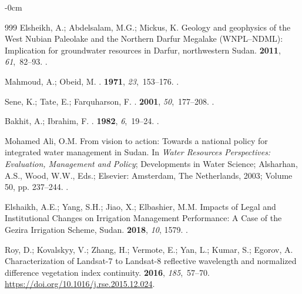 \documentclass[jimaging,article,accept,pdftex,moreauthors]{Definitions/mdpi}
\begin{document}
\begin{adjustwidth}{-\extralength}{0cm}
\begin{thebibliography}{999}
Elsheikh, A.; Abdelsalam, M.G.; Mickus, K.
\newblock Geology and geophysics of the West Nubian Paleolake and the Northern
  Darfur Megalake (WNPL–NDML): Implication for groundwater resources in
  Darfur, northwestern Sudan.
 {\bf 2011}, {\em 61},~82--93.
.

Mahmoud, A.; Obeid, M.
.
 {\bf 1971}, {\em 23},~153--176.
.

Sene, K.; Tate, E.; Farquharson, F.
.
 {\bf 2001}, {\em 50},~177--208.
.

Bakhit, A.; Ibrahim, F.
.
 {\bf 1982}, {\em 6},~19--24.
.

{Mohamed Ali}, O.M.
\newblock From vision to action: Towards a national policy for integrated water
  management in Sudan. In {\em Water Resources Perspectives: Evaluation,
  Management and Policy}; Developments in Water Science; Alsharhan, A.S., Wood, W.W., Eds.; Elsevier: Amsterdam, The Netherlands, %
  2003;
  Volume 50, pp. 237--244.
.

Elshaikh, A.E.; Yang, S.H.; Jiao, X.; Elbashier, M.M.
\newblock Impacts of Legal and Institutional Changes on Irrigation Management
  Performance: A Case of the Gezira Irrigation Scheme, Sudan.
 {\bf 2018}, {\em 10}, 1579.
.

Roy, D.; Kovalskyy, V.; Zhang, H.; Vermote, E.; Yan, L.; Kumar, S.; Egorov, A.
\newblock Characterization of Landsat-7 to Landsat-8 reflective wavelength and
  normalized difference vegetation index continuity.
 {\bf 2016}, {\em 185},~57--70.
  {\url{https://doi.org/10.1016/j.rse.2015.12.024}}.


\end{thebibliography}
\end{adjustwidth}
\end{document}
